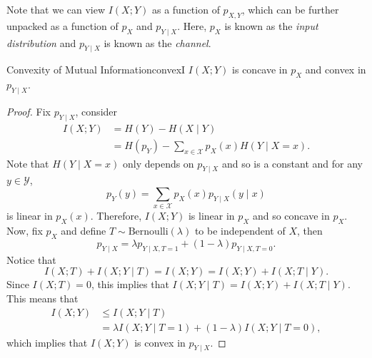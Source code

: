 \documentclass[math]{amznotes}
\theoremstyle{remark}
\begin{document}
Note that we can view $I\left(X ; Y\right)$ as a function of $p_{X, Y}$, which can be further unpacked as a function of $p_X$ and $p_{Y \mid X}$. Here, $p_X$ is known as the \textit{input distribution} and $p_{Y \mid X}$ is known as the \textit{channel}.
\begin{thmbox}{Convexity of Mutual Information}{convexI}
    $I\left(X ; Y\right)$ is concave in $p_X$ and convex in $p_{Y \mid X}$.
    \tcblower
    \begin{proof}
        Fix $p_{Y \mid X}$, consider
        \begin{align*}
            I\left(X ; Y\right) & = H\left(Y\right) - H\left(X \mid Y\right) \\
            & = H\left(p_Y\right) - \sum_{x \in \mathcal{X}}p_X\left(x\right)H\left(Y \mid X = x\right).
        \end{align*}
        Note that $H\left(Y \mid X = x\right)$ only depends on $p_{Y \mid X}$ and so is a constant and for any $y \in \mathcal{Y}$,
        \begin{equation*}
            p_Y\left(y\right) = \sum_{x \in \mathcal{X}}p_X\left(x\right)p_{Y \mid X}\left(y \mid x\right)
        \end{equation*}
        is linear in $p_X\left(x\right)$. Therefore, $I\left(X ; Y\right)$ is linear in $p_X$ and so concave in $p_X$. Now, fix $p_X$ and define $T \sim \mathrm{Bernoulli}\left(\lambda\right)$ to be independent of $X$, then 
        \begin{equation*}
            p_{Y \mid X} = \lambda p_{Y \mid X, T = 1} + \left(1 - \lambda\right)p_{Y \mid X, T = 0}.
        \end{equation*}
        Notice that 
        \begin{equation*}
            I\left(X ; T\right) + I\left(X ; Y \mid T\right) = I\left(X ; Y\right) = I\left(X ; Y\right) + I\left(X ; T \mid Y\right).
        \end{equation*}
        Since $I\left(X ; T\right) = 0$, this implies that $I\left(X ; Y \mid T\right) = I\left(X ; Y\right) + I\left(X ; T \mid Y\right)$. This means that 
        \begin{align*}
            I\left(X ; Y\right) & \leq I\left(X ; Y \mid T\right) \\
            & = \lambda I\left(X ; Y \mid T = 1\right) + \left(1 - \lambda\right)I\left(X ; Y \mid T = 0\right),
        \end{align*}
        which implies that $I\left(X ; Y\right)$ is convex in $p_{Y \mid X}$. 
    \end{proof}
\end{thmbox}
\end{document}
